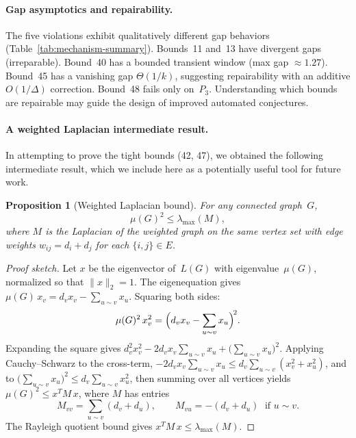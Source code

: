 \documentclass[preprint,12pt]{elsarticle}
\newtheorem{proposition}[theorem]{Proposition}
\theoremstyle{definition}
\theoremstyle{remark}
\newcommand{\Lspec}{\mu}               %
\begin{document}
\paragraph{Gap asymptotics and repairability.}
The five violations exhibit qualitatively different gap behaviors
(Table~\ref{tab:mechanism-summary}).
Bounds~11 and~13 have divergent gaps (irreparable).
Bound~40 has a bounded transient window (max gap $\approx 1.27$).
Bound~45 has a vanishing gap $\Theta(1/k)$, suggesting repairability
with an additive $O(1/\Delta)$ correction.
Bound~48 fails only on~$P_3$.
Understanding which bounds are repairable may guide the design of
improved automated conjectures.

\paragraph{A weighted Laplacian intermediate result.}
In attempting to prove the tight bounds (42, 47), we obtained the
following intermediate result, which we include here as a potentially
useful tool for future work.

\begin{proposition}[Weighted Laplacian bound]\label{prop:weighted-laplacian}
  For any connected graph~$G$,
  \[
    \Lspec(G)^2 \leq \lambda_{\max}(M),
  \]
  where $M$ is the Laplacian of the weighted graph on the same vertex set
  with edge weights $w_{ij} = d_i + d_j$ for each $\{i,j\} \in E$.
\end{proposition}

\begin{proof}[Proof sketch]
  Let $x$ be the eigenvector of~$L(G)$ with eigenvalue~$\Lspec(G)$, normalized
  so that $\|x\|_2 = 1$. The eigenequation gives
  $\Lspec(G)\, x_v = d_v x_v - \sum_{u \sim v} x_u$. Squaring both sides:
  \[
    \Lspec(G)^2\, x_v^2 = \Bigl(d_v x_v - \sum_{u \sim v} x_u\Bigr)^{\!2}.
  \]
  Expanding the square gives $d_v^2 x_v^2 - 2 d_v x_v \sum_{u \sim v} x_u
  + \bigl(\sum_{u \sim v} x_u\bigr)^2$.
  Applying Cauchy--Schwarz to the cross-term,
  $-2 d_v x_v \sum_{u \sim v} x_u \leq d_v \sum_{u \sim v}(x_v^2 + x_u^2)$,
  and to $\bigl(\sum_{u \sim v} x_u\bigr)^2 \leq
  d_v \sum_{u \sim v} x_u^2$, then summing over all
  vertices yields $\Lspec(G)^2 \leq x^T M\, x$, where $M$ has entries
  \[
    M_{vv} = \sum_{u \sim v} (d_v + d_u), \qquad
    M_{vu} = -(d_v + d_u) \;\text{ if } u \sim v.
  \]
  The Rayleigh quotient bound gives $x^T M\, x \leq \lambda_{\max}(M)$.
\end{proof}
\end{document}
